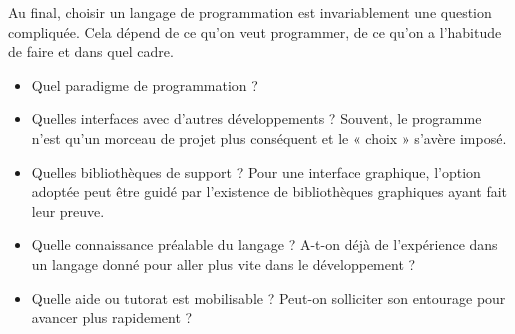 Au final, choisir un langage de programmation est invariablement une question compliquée. Cela dépend de ce qu'on veut programmer, de ce qu'on a l'habitude de faire et dans quel cadre.
\begin{itemize}\jazzitem
\item Quel paradigme de programmation ?
\item Quelles interfaces avec d'autres développements ? Souvent, le programme n'est qu'un morceau de projet plus conséquent et le « choix » s'avère imposé.
\item Quelles bibliothèques de support ? Pour une interface graphique, l'option adoptée peut être guidé par l'existence de bibliothèques graphiques ayant fait leur preuve.
\item Quelle connaissance préalable du langage ? A-t-on déjà de l’expérience dans un langage donné pour aller plus vite dans le développement ?
\item Quelle aide ou tutorat est mobilisable ? Peut-on solliciter son entourage pour avancer plus rapidement ?
\end{itemize}

